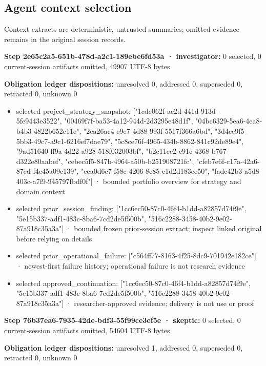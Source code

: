 \documentclass[11pt]{article}
\begin{document}
\subsection{Agent context selection}
Context extracts are deterministic, untrusted summaries; omitted evidence remains in the original session records.\par
\textbf{Step 2e65c2a5-651b-478d-a2c1-189ebe6fd53a · investigator:} 0 selected, 0 current-session artifacts omitted, 49907 UTF-8 bytes\par
\textbf{Obligation ledger dispositions:} unresolved 0, addressed 0, superseded 0, retracted 0, unknown 0\par
\begin{itemize}
\item selected project\_strategy\_snapshot: ["1cde062f-ac2d-441d-913d-5fe9443e3522", "00469f7f-ba53-4a12-944d-2d3295e48d1f", "04bc6329-5ea6-4ea8-b4b3-4822b652c11e", "2ca26ac4-c9e7-4d88-993f-5517f366a6bd", "3d4cc9f5-5bb3-49c7-a9c1-6216ef7dae79", "5c8ce76f-4965-434b-8862-841c92de89e4", "9ad51640-ff9a-4d22-a928-518f032003bf", "b2c11cc2-e91c-4368-b767-d322e80aabef", "cebec5f5-847b-4964-a50b-b251908721fc", "cfeb7e6f-c17a-42a6-87ed-f4e45a09c139", "eea0d6c7-f58c-4206-8e85-c1d2d183ee50", "fadc42b3-a5d8-403c-a7f9-945797fbdf0f"] · bounded portfolio overview for strategy and domain context
\item selected prior\_session\_finding: ["1cc6ec50-87c0-46f4-b1dd-a82857d74f9e", "5e15b337-adf1-483c-8ba6-7cd2de5f500b", "516c2288-3458-40b2-9e02-87a918c35a3a"] · bounded frozen prior-session extract; inspect linked original before relying on details
\item selected prior\_operational\_failure: ["c564ff77-8163-4f25-8dc9-701942e182ce"] · newest-first failure history; operational failure is not research evidence
\item selected approved\_continuation: ["1cc6ec50-87c0-46f4-b1dd-a82857d74f9e", "5e15b337-adf1-483c-8ba6-7cd2de5f500b", "516c2288-3458-40b2-9e02-87a918c35a3a"] · researcher-approved evidence; delivery is not use or proof
\end{itemize}
\textbf{Step 76b37ea6-7935-42de-bdf3-55f99ce3ef5e · skeptic:} 0 selected, 0 current-session artifacts omitted, 54604 UTF-8 bytes\par
\textbf{Obligation ledger dispositions:} unresolved 1, addressed 0, superseded 0, retracted 0, unknown 0\par
\end{document}
